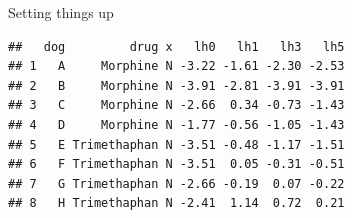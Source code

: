 \begin{frame}[fragile]{Setting things up}


 
\begin{knitrout}
\color{fgcolor}\begin{kframe}
\begin{alltt}
\hlkwb{=}\hlstd{(}\hlstd{,}
\end{alltt}
\begin{verbatim}
##   dog         drug x   lh0   lh1   lh3   lh5
## 1   A     Morphine N -3.22 -1.61 -2.30 -2.53
## 2   B     Morphine N -3.91 -2.81 -3.91 -3.91
## 3   C     Morphine N -2.66  0.34 -0.73 -1.43
## 4   D     Morphine N -1.77 -0.56 -1.05 -1.43
## 5   E Trimethaphan N -3.51 -0.48 -1.17 -1.51
## 6   F Trimethaphan N -3.51  0.05 -0.31 -0.51
## 7   G Trimethaphan N -2.66 -0.19  0.07 -0.22
## 8   H Trimethaphan N -2.41  1.14  0.72  0.21
\end{verbatim}
\begin{alltt}
\hlkwb{=}
\hlkwb{=}\hlopt{~}
\end{alltt}
\end{kframe}
\end{knitrout}
  
    
\end{frame}

